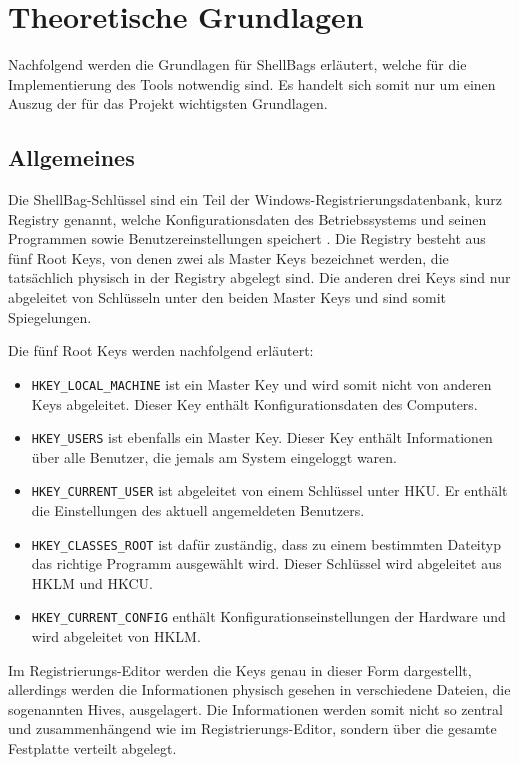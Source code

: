 \section{Theoretische Grundlagen}
Nachfolgend werden die Grundlagen für ShellBags erläutert, welche für die Implementierung des Tools notwendig sind. Es handelt sich somit nur um einen Auszug der für das Projekt wichtigsten Grundlagen. 

\subsection{Allgemeines}
Die ShellBag-Schlüssel sind ein Teil der Windows-Registrierungsdatenbank, kurz Registry genannt, welche Konfigurationsdaten des Betriebssystems und seinen Programmen sowie Benutzereinstellungen speichert \cite[S.215]{anson2012mastering}. Die Registry besteht aus fünf Root Keys, von denen zwei als Master Keys bezeichnet werden, die tatsächlich physisch in der Registry abgelegt sind. Die anderen drei Keys sind nur abgeleitet von Schlüsseln unter den beiden Master Keys und sind somit Spiegelungen. \cite[S.219]{anson2012mastering} 

Die fünf Root Keys werden nachfolgend erläutert:
\begin{itemize}
	\item \texttt{HKEY\_LOCAL\_MACHINE} ist ein Master Key und wird somit nicht von anderen Keys abgeleitet. Dieser Key enthält Konfigurationsdaten des Computers.
	\item \texttt{HKEY\_USERS} ist ebenfalls ein Master Key. Dieser Key enthält Informationen über alle Benutzer, die jemals am System eingeloggt waren.
	\item  \texttt{HKEY\_CURRENT\_USER} ist abgeleitet von einem Schlüssel unter HKU. Er enthält die Einstellungen des aktuell angemeldeten Benutzers.
	\item \texttt{HKEY\_CLASSES\_ROOT} ist dafür zuständig, dass zu einem bestimmten Dateityp das richtige Programm ausgewählt wird. Dieser Schlüssel wird abgeleitet aus HKLM und HKCU.
	\item \texttt{HKEY\_CURRENT\_CONFIG} enthält Konfigurationseinstellungen der Hardware und wird abgeleitet von HKLM. \cite[S.219]{anson2012mastering}
\end{itemize}
Im Registrierungs-Editor werden die Keys genau in dieser Form dargestellt, allerdings werden die Informationen physisch gesehen in verschiedene Dateien, die sogenannten Hives, ausgelagert. Die Informationen werden somit nicht so zentral und zusammenhängend wie im Registrierungs-Editor, sondern über die gesamte Festplatte verteilt abgelegt. \cite[S.220]{anson2012mastering} 

